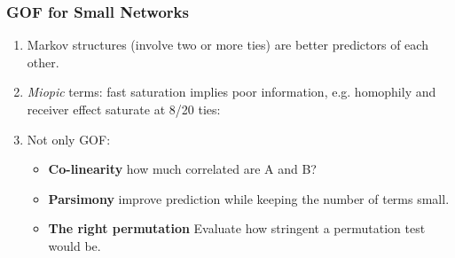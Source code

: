 \documentclass[aspectratio=169, 9pt]{beamer}
\begin{document}
\begin{frame}[c]
\frametitle{GOF for Small Networks}


\begin{enumerate}
	\item Markov structures (involve two or more ties) are better predictors of each other.
	\item \textit{Miopic} terms: fast saturation implies poor information, e.g. homophily and receiver effect saturate at 8/20 ties:
	\begin{figure}
	\centering
	{\footnotesize{}
	
	}
	\end{figure}
	\vspace{.5cm}
	\item Not only GOF:
	\begin{itemize}
		\item \textbf{Co-linearity} how much correlated are A and B?
		\item \textbf{Parsimony} improve prediction while keeping the number of terms small.
		\item \textbf{The right permutation} Evaluate how stringent a permutation test would be.
	\end{itemize}
\end{enumerate}



\end{frame}
\end{document}

